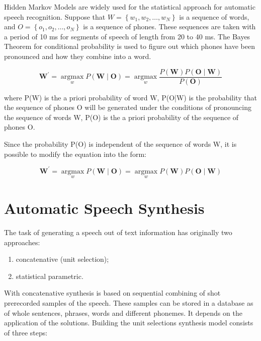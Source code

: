 Hidden Markov Models are widely used for the statistical approach for automatic speech recognition. Suppose that $W=\left\{w_{1}, w_{2}, \ldots, w_{N}\right\}$ is a sequence of words, and $O=\left\{o_{1}, o_{2}, \ldots, o_{N}\right\}$ is a sequence of phones. These sequences are taken with a period of 10 ms for segments of speech of length from 20 to 40 ms. The Bayes Theorem for conditional probability is used to figure out which phones have been pronounced and how they combine into a word.

\begin{equation}
    \boldsymbol{W}^{\prime}=\underset{w}{\operatorname{argmax}} P(\boldsymbol{W} \mid \boldsymbol{O})=\underset{w}{\operatorname{argmax}} \frac{P(\boldsymbol{W}) P(\boldsymbol{O} \mid \boldsymbol{W})}{P(\boldsymbol{O})}
\end{equation}

where P(W) is the a priori probability of word W, P(O|W) is the probability that the sequence of phones O will be generated under the conditions of pronouncing the sequence of words W, P(O) is the a priori probability of the sequence of phones O. 

Since the probability P(O) is independent of the sequence of words W, it is possible to modify the equation into the form:

\begin{equation}
    \boldsymbol{W}^{\prime}=\underset{w}{\operatorname{argmax}} P(\boldsymbol{W} \mid \boldsymbol{O})=\underset{w}{\operatorname{argmax}} P(\boldsymbol{W}) P(\boldsymbol{O} \mid \boldsymbol{W})
\end{equation}

\section{Automatic Speech Synthesis}

The task of generating a speech out of text information has originally two approaches:
\begin{enumerate}
    \item concatenative (unit selection);
    \item statistical parametric.
\end{enumerate}

With concatenative synthesis is based on sequential combining of shot prerecorded samples of the speech. These samples can be stored in a database as of whole sentences, phrases, words and different phonemes. It depends on the application of the solutions. Building the unit selections synthesis model consists of three steps:

